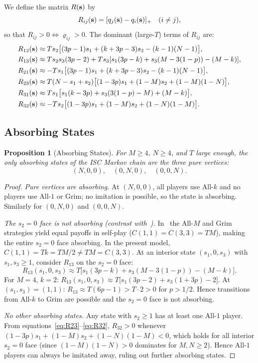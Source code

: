 \documentclass[12pt,a4paper]{article}
\newtheorem{proposition}{Proposition}[section]
\begin{document}
We define the matrix $R({\bf s})$ by
\[
  R_{ij}({\bf s}) = [q_j({\bf s})-q_i({\bf s})]_+ \quad (i\neq j),
\]
so that $R_{ij}>0 \Leftrightarrow \varrho_{ij}>0$.  The dominant (large-$T$)
terms of $R_{ij}$ are:
\begin{align}
  R_{12}({\bf s}) &\approx Ts_2\bigl[(3p-1)s_1+(k+3p-3)s_2-(k-1)(N-1)\bigr],\label{eq:R12}\\
  R_{13}({\bf s}) &\approx Ts_2s_3(3p-2)+Ts_3[s_1(3p-k)+s_3(M-3(1-p))-(M-k)],\label{eq:R13}\\
  R_{21}({\bf s}) &\approx -Ts_1\bigl[(3p-1)s_1+(k+3p-3)s_2-(k-1)(N-1)\bigr],\label{eq:R21}\\
  R_{23}({\bf s}) &\approx T(N-s_1+s_2)\bigl[(1-3p)s_1+(1-M)s_2+(1-M)(1-N)\bigr],\label{eq:R23}\\
  R_{31}({\bf s}) &\approx Ts_1\bigl[s_1(k-3p)+s_3(3(1-p)-M)+(M-k)\bigr],\label{eq:R31}\\
  R_{32}({\bf s}) &\approx -Ts_2\bigl[(1-3p)s_1+(1-M)s_2+(1-N)(1-M)\bigr].\label{eq:R32}
\end{align}

\subsection{Absorbing States}

\begin{proposition}[Absorbing States]\label{prop:absorbing}
For $M\geq 4$, $N\geq 4$, and $T$ large enough, the only absorbing states of
the ISC Markov chain are the three pure vertices:
\[
  (N,0,0),\quad (0,N,0),\quad (0,0,N).
\]
\end{proposition}

\begin{proof}
\textit{Pure vertices are absorbing.}  At $(N,0,0)$, all players use
All-$k$ and no players use All-$1$ or Grim; no imitation is possible, so the
state is absorbing. Similarly for $(0,N,0)$ and $(0,0,N)$.

\textit{The $s_2=0$ face is \emph{not} absorbing (contrast with~\cite{LK2026}).}
In~\cite{LK2026} the All-$M$ and Grim strategies yield equal payoffs in
self-play ($C(1,1)=C(3,3)=TM$), making the entire $s_2=0$ face absorbing. In
the present model, $C(1,1)=Tk=TM/2\neq TM=C(3,3)$. At an interior state
$(s_1,0,s_3)$ with $s_1,s_3\geq 1$, consider $R_{13}$ on the $s_2=0$ face:
\[
  R_{13}(s_1,0,s_3) \approx T\bigl[s_1(3p-k)+s_3(M-3(1-p))-(M-k)\bigr].
\]
For $M=4$, $k=2$:
$R_{13}(s_1,0,s_3)\approx T\bigl[s_1(3p-2)+s_3(1+3p)-2\bigr]$.
At $(s_1,s_3)=(1,1)$: $R_{13}\approx T(6p-1)>T\cdot 2>0$ for $p>1/2$.
Hence transitions from All-$k$ to Grim are possible and the $s_2=0$ face is
not absorbing.

\textit{No other absorbing states.}  Any state with $s_2\geq 1$ has at least
one All-$1$ player. From equations~\eqref{eq:R23}--\eqref{eq:R32}, $R_{32}>0$
whenever $(1-3p)s_1+(1-M)s_2+(1-N)(1-M)<0$, which holds for all interior
$s_2=0$ face (since $(1-M)(1-N)>0$ dominates for $M,N\geq 2$). Hence All-$1$
players can always be imitated away, ruling out further absorbing states.
\end{proof}
\end{document}
